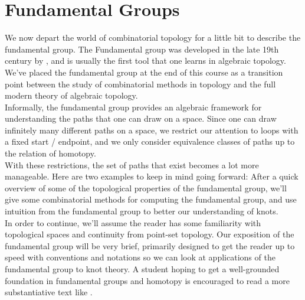 
\section{Fundamental Groups}
We now depart the world of combinatorial topology for a little bit to describe the fundamental group. The Fundamental group was developed in the late 19th century by \cite{poincare1895analysis}, and is usually the first tool that one learns in algebraic topology. We've placed the fundamental group at the end of this course as a transition point between the study of combinatorial methods in topology and the full modern theory of algebraic topology. \\
Informally, the fundamental group provides an algebraic framework for understanding the paths that one can draw on a space. Since one can draw infinitely many different paths on a space, we restrict our attention to loops with a fixed start / endpoint, and we only consider equivalence classes of paths up to the relation of homotopy.\\
With these restrictions, the set of paths that exist becomes a lot more manageable. Here are two examples to keep in mind going forward:
After a quick overview of some of the topological properties of the fundamental group, we'll give some combinatorial methods for computing the fundamental group, and use intuition from the fundamental group to better our understanding of knots.\\
In order to continue, we'll assume the reader has some familiarity with topological spaces and continuity from point-set topology. Our exposition of the fundamental group will be very brief, primarily designed to get the reader up to speed with conventions and notations so we can look at applications of the fundamental group to knot theory. A student hoping to get a well-grounded foundation in fundamental groups and homotopy is encouraged to read a more substantiative text like \cite{hatcher2002algebraic}. 
